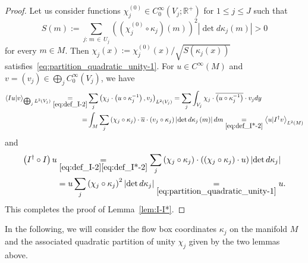 \documentclass[10pt]{amsart}
\theoremstyle{definition}\newtheorem{defi}[theo]{Definition}\newtheorem{rema}[theo]{Remark}\newtheorem{exam}[theo]{Example}\newtheorem{exem}[theo]{Example}\newtheorem{nota}[theo]{Notation}
\newcommand{\bbR}{\mathbb{R}}
\begin{document}
\begin{proof}
Let us consider functions $\chi_{j}^{(0)}\in C_{0}^{\infty}(V_{j};\bbR^{+})$ for $1\leq j\leq J$ such that
\[
S\left(m\right):=\sum_{j:\,m\,\in\,U_{j}}\left(\left(\chi_{j}^{\left(0\right)}\circ\kappa_{j}\right)\left(m\right)\right)^{2}\left|\det d\kappa_{j}\left(m\right)\right|>0
\]
for every $m\in M$. Then $\chi_{j}(x):=\chi_{j}^{(0)}(x)/\sqrt{S(\kappa_{j}(x))}$ satisfies~\eqref{eq:partition_quadratic_unity-1}. For $u\in C^{\infty}(M)$ and $v=(v_{j})\in\bigoplus_{j}C_{0}^{\infty}(V_{j})$, we have
\begin{align*}
\left\langle Iu|v\right\rangle _{\bigoplus_{j}L^{2}\left(V_{j}\right)} \underset{\eqref{eq:def_I-2}}{=}& \sum_{j}\left(\chi_{j}\cdot\left(u\circ\kappa_{j}^{-1}\right),v_{j}\right)_{L^{2}\left(V_{j}\right)}=\sum_{j}\int_{V_{j}}\chi_{j}\cdot\overline{\left(u\circ\kappa_{j}^{-1}\right)}\cdot v_{j}dy\\
 =& \int_{M}\sum_{j}\left(\chi_{j}\circ\kappa_{j}\right)\cdot\overline{u}\cdot\left(v_{j}\circ\kappa_{j}\right)\left|\det d\kappa_{j}\left(m\right)\right|dm\underset{\eqref{eq:def_I*-2}}{=}\left\langle u|I^{\dagger}v\right\rangle _{L^{2}\left(M\right)}
\end{align*}
and
\begin{align*}
\left(I^{\dagger}\circ I\right)u & \underset{\eqref{eq:def_I-2}\eqref{eq:def_I*-2}}{=}\sum_{j}\left(\chi_{j}\circ\kappa_{j}\right)\cdot\left(\left(\chi_{j}\circ\kappa_{j}\right)\cdot u\right)\left|\det d\kappa_{j}\right|\\
& =u\sum_{j}\left(\chi_{j}\circ\kappa_{j}\right)^{2}\left|\det d\kappa_{j}\right|\underset{\eqref{eq:partition_quadratic_unity-1}}{=}u.
\end{align*}
This completes the proof of Lemma~\ref{lem:I-I*}.
\end{proof}

In the following, we will consider the flow box coordinates $\kappa_{j}$ on the manifold $M$ and the associated quadratic partition of unity $\chi_{j}$ given by the two lemmas above.
\end{document}
